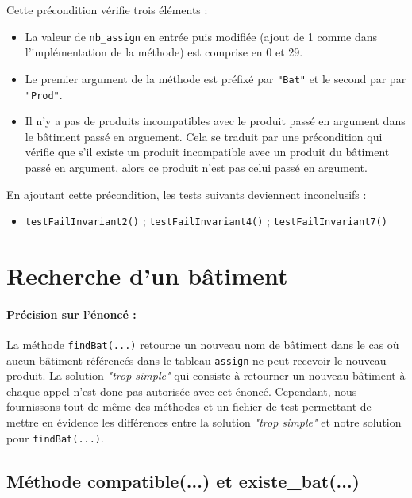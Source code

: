 \documentclass{article}
\begin{document}
\noindent
Cette précondition vérifie trois éléments :
\begin{itemize}
\item La valeur de \texttt{nb\_assign} en entrée puis modifiée (ajout de 1 comme dans l'implémentation de la méthode) est comprise en 0 et 29.
\item Le premier argument de la méthode est préfixé par \texttt{"Bat"} et le second par par \texttt{"Prod"}.
\item Il n'y a pas de produits incompatibles avec le produit passé en argument dans le bâtiment passé en arguement. Cela se traduit par une précondition qui vérifie que s'il existe un produit incompatible avec un produit du bâtiment passé en argument, alors ce produit n'est pas celui passé en argument.
\end{itemize}

\vspace{0.3cm}
\noindent
En ajoutant cette précondition, les tests suivants deviennent inconclusifs :
\begin{itemize}
\renewcommand{\labelitemi}{$\rightarrow$} 
\item \texttt{testFailInvariant2()} ; \texttt{testFailInvariant4()} ; \texttt{testFailInvariant7()}
\end{itemize}

\section{Recherche d'un bâtiment}

\paragraph{Précision sur l'énoncé :} La méthode \texttt{findBat(...)} retourne un nouveau nom de bâtiment dans le cas où aucun bâtiment référencés dans le tableau \texttt{assign} ne peut recevoir le nouveau produit. La solution \textit{"trop simple"} qui consiste à retourner un nouveau bâtiment à chaque appel n'est donc pas autorisée avec cet énoncé. Cependant, nous fournissons tout de même des méthodes et un fichier de test permettant de mettre en évidence les différences entre la solution \textit{"trop simple"} et notre solution pour \texttt{findBat(...)}.

\subsection{Méthode compatible(...) et existe\_bat(...)}
\end{document}
